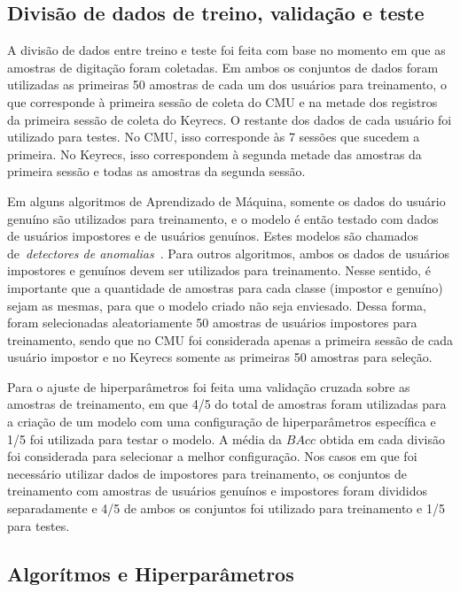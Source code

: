 \subsection{Divisão de dados de treino, validação e teste}

A divisão de dados entre treino e teste foi feita com base no momento em que as amostras de digitação foram coletadas. Em ambos os conjuntos de dados foram utilizadas as primeiras 50 amostras de cada um dos usuários para treinamento, o que corresponde à primeira sessão de coleta do CMU e na metade dos registros da primeira sessão de coleta do Keyrecs. O restante dos dados de cada usuário foi utilizado para testes. No CMU, isso corresponde às 7 sessões que sucedem a primeira. No Keyrecs, isso correspondem à segunda metade das amostras da primeira sessão e todas as amostras da segunda sessão.   

Em alguns algoritmos de Aprendizado de Máquina, somente os dados do usuário genuíno são utilizados para treinamento, e o modelo é então testado com dados de usuários impostores e de usuários genuínos. Estes modelos são chamados de~\textit{detectores de anomalias}~\cite{Killourhy2009}. Para outros algoritmos, ambos os dados de usuários impostores e genuínos devem ser utilizados para treinamento. Nesse sentido, é importante que a quantidade de amostras para cada classe (impostor e genuíno) sejam as mesmas, para que o modelo criado não seja enviesado. Dessa forma, foram selecionadas aleatoriamente 50 amostras de usuários impostores para treinamento, sendo que no CMU foi considerada apenas a primeira sessão de cada usuário impostor e no Keyrecs somente as primeiras 50 amostras para seleção.

Para o ajuste de hiperparâmetros foi feita uma validação cruzada sobre as amostras de treinamento, em que 4/5 do total de amostras foram utilizadas para a criação de um modelo com uma configuração de hiperparâmetros específica e 1/5 foi utilizada para testar o modelo. A média da $BAcc$ obtida em cada divisão foi considerada para selecionar a melhor configuração. Nos casos em que foi necessário utilizar dados de impostores para treinamento, os conjuntos de treinamento com amostras de usuários genuínos e impostores foram divididos separadamente e 4/5 de ambos os conjuntos foi utilizado para treinamento e 1/5 para testes.


\subsection{Algorítmos e Hiperparâmetros}

